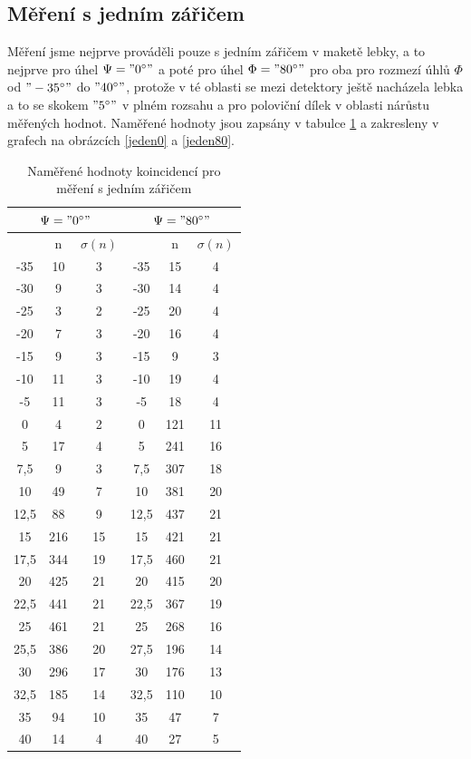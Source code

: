 \documentclass[10pt,a4paper]{article}
\begin{document}
\subsection*{Měření s jedním zářičem}
Měření jsme nejprve prováděli pouze s jedním zářičem v maketě lebky, a to nejprve pro úhel $\Psi="0 ^\circ"$ a poté pro úhel $\Phi="80 ^\circ"$ pro oba pro rozmezí úhlů $\Phi$ od $"-35 ^\circ"$ do $"40 ^\circ"$, protože v té oblasti se mezi detektory ještě nacházela lebka a to se skokem $"5 ^\circ"$ v plném rozsahu a pro poloviční dílek v oblasti nárůstu měřených hodnot. Naměřené hodnoty jsou zapsány v tabulce \ref{jedenzaric} a zakresleny v grafech na obrázcích \ref{jeden0} a \ref{jeden80}.
\begin{table}[h]
\centering
\caption{Naměřené hodnoty koincidencí pro měření s jedním zářičem}
\label{jedenzaric}
\begin{tabular}{|c|c|c|c|c|c|}
\hline
\multicolumn{3}{|c|}{$\Psi="0^\circ"$}&\multicolumn{3}{c|}{$\Psi="80^\circ"$}
\\
\hline
\popi{\Phi}{\dg}&n&$\sigma(n)$&\popi{\Phi}{\dg}&n&$\sigma(n)$
\\
\hline
-35&10&3&-35&15&4
\\
\hline
-30&9&3&-30&14&4
\\
\hline
-25&3&2&-25&20&4
\\
\hline
-20&7&3&-20&16&4
\\
\hline
-15&9&3&-15&9&3
\\
\hline
-10&11&3&-10&19&4
\\
\hline
-5&11&3&-5&18&4
\\
\hline
0&4&2&0&121&11
\\
\hline
5&17&4&5&241&16
\\
\hline
7,5&9&3&7,5&307&18
\\
\hline
10&49&7&10&381&20
\\
\hline
12,5&88&9&12,5&437&21
\\
\hline
15&216&15&15&421&21
\\
\hline
17,5&344&19&17,5&460&21
\\
\hline
20&425&21&20&415&20
\\
\hline
22,5&441&21&22,5&367&19
\\
\hline
25&461&21&25&268&16
\\
\hline
25,5&386&20&27,5&196&14
\\
\hline
30&296&17&30&176&13
\\
\hline
32,5&185&14&32,5&110&10
\\
\hline
35&94&10&35&47&7
\\
\hline
40&14&4&40&27&5
\\
\hline
\end{tabular}
\end{table}
\end{document}
